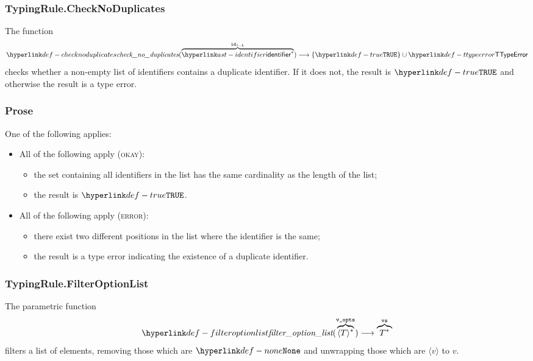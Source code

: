 \subsubsection{TypingRule.CheckNoDuplicates \label{sec:TypingRule.CheckNoDuplicates}}
The function
\[
  \checknoduplicates(\overname{\identifier^*}{\id_{1..k}}) \aslto \{\True\} \cup \TTypeError
\]
checks whether a non-empty list of identifiers contains a duplicate identifier. If it does not, the result
is $\True$ and otherwise the result is a type error.

\subsubsection{Prose}
One of the following applies:
\begin{itemize}
  \item All of the following apply (\textsc{okay}):
  \begin{itemize}
    \item the set containing all identifiers in the list has the same cardinality as the length of the list;
    \item the result is $\True$.
  \end{itemize}

  \item All of the following apply (\textsc{error}):
  \begin{itemize}
    \item there exist two different positions in the list where the identifier is the same;
    \item the result is a type error indicating the existence of a duplicate identifier.
  \end{itemize}
\end{itemize}


\hypertarget{def-filteroptionlist}{}
\subsubsection{TypingRule.FilterOptionList \label{sec:TypingRule.FilterOptionList}}
The parametric function
\[
  \filteroptionlist(\overname{\langle T \rangle^*}{\vvopts}) \aslto \overname{T^*}{\vvs}
\]
filters a list of \optional{} elements, removing those which are $\None$ and unwrapping those which are $\langle v \rangle$ to $v$.


